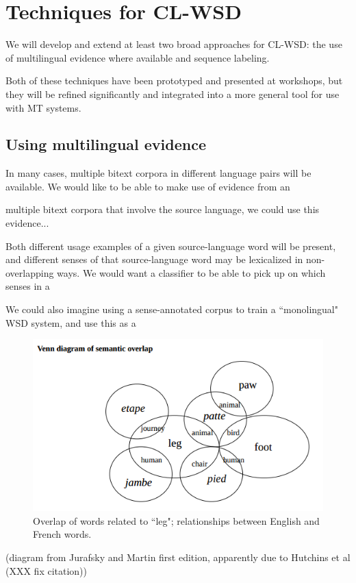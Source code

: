 \section{Techniques for CL-WSD}

We will develop and extend at least two broad approaches for CL-WSD: the use
of multilingual evidence where available and sequence labeling.

Both of these techniques have been prototyped and presented at workshops, but
they will be refined significantly and integrated into a more general tool for
use with MT systems.

\subsection{Using multilingual evidence}
In many cases, multiple bitext corpora in different language pairs will be
available.
We would like to be able to make use of evidence from an

multiple bitext corpora that involve the source language, we could use this
evidence...

Both different usage examples of a given source-language word will be present,
and different senses of that source-language word may be lexicalized in
non-overlapping ways. We would want a classifier to be able to pick up on which
senses in a 

We could also imagine using a sense-annotated corpus to train a ``monolingual"
WSD system, and use this as a 

\begin{figure}
  \includegraphics[width=12cm]{hutchins-leg-etc.png}
  \caption{Overlap of words related to ``leg"; relationships between English
  and French words.}
  \label{fig:leg}
\end{figure}
(diagram from Jurafsky and Martin first edition, apparently due to Hutchins et
al (XXX fix citation))


